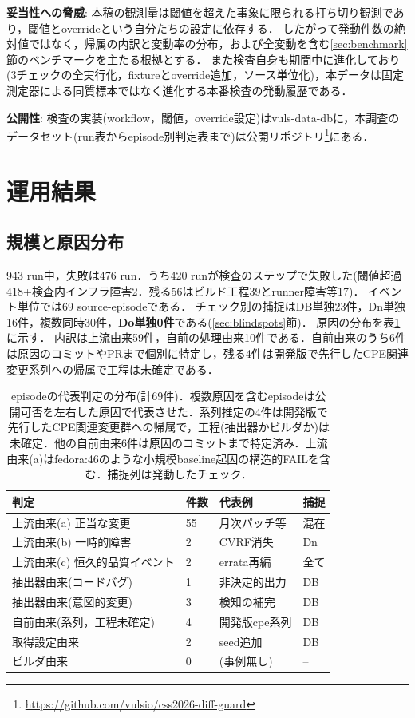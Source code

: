 \documentclass{css}
\begin{document}
\textbf{妥当性への脅威}:
本稿の観測量は閾値を超えた事象に限られる打ち切り観測であり，閾値とoverrideという自分たちの設定に依存する．
したがって発動件数の絶対値ではなく，帰属の内訳と変動率の分布，および全変動を含む\ref{sec:benchmark}節のベンチマークを主たる根拠とする．
また検査自身も期間中に進化しており(3チェックの全実行化，fixtureとoverride追加，ソース単位化)，本データは固定測定器による同質標本ではなく進化する本番検査の発動履歴である．

\textbf{公開性}:
検査の実装(workflow，閾値，override設定)はvuls-data-db\cite{vuls-data-db}に，本調査のデータセット(run表からepisode別判定表まで)は公開リポジトリ\footnote{\url{https://github.com/vulsio/css2026-diff-guard}}にある．

\section{運用結果}
\label{sec:results}

\subsection{規模と原因分布}
\label{sec:scale}

943 run中，失敗は476 run．うち420 runが検査のステップで失敗した(閾値超過418+検査内インフラ障害2．残る56はビルド工程39とrunner障害等17)．
イベント単位では69 source-episodeである．
チェック別の捕捉はDB単独23件，Dn単独16件，複数同時30件，\textbf{Do単独0件}である(\ref{sec:blindspots}節)．
原因の分布を表\ref{tab:attribution}に示す．
内訳は上流由来59件，自前の処理由来10件である．自前由来のうち6件は原因のコミットやPRまで個別に特定し，残る4件は開発版で先行したCPE関連変更系列への帰属で工程は未確定である．

\begin{table}[tb]
\caption{episodeの代表判定の分布(計69件)．複数原因を含むepisodeは公開可否を左右した原因で代表させた．系列推定の4件は開発版で先行したCPE関連変更群への帰属で，工程(抽出器かビルダか)は未確定．他の自前由来6件は原因のコミットまで特定済み．上流由来(a)はfedora:46のような小規模baseline起因の構造的FAILを含む．捕捉列は発動したチェック．}
\label{tab:attribution}
\centering
\small
\setlength{\tabcolsep}{3pt}
\begin{tabular}{llll}
\hline
判定 & 件数 & 代表例 & 捕捉 \\
\hline
上流由来(a) 正当な変更 & 55 & 月次パッチ等 & 混在 \\
上流由来(b) 一時的障害 & 2 & CVRF消失 & Dn \\
上流由来(c) 恒久的品質イベント & 2 & errata再編 & 全て \\
抽出器由来(コードバグ) & 1 & 非決定的出力 & DB \\
抽出器由来(意図的変更) & 3 & 検知の補完 & DB \\
自前由来(系列，工程未確定) & 4 & 開発版cpe系列 & DB \\
取得設定由来 & 2 & seed追加 & DB \\
ビルダ由来 & 0 & (事例無し) & -- \\
\hline
\end{tabular}
\end{table}
\end{document}
